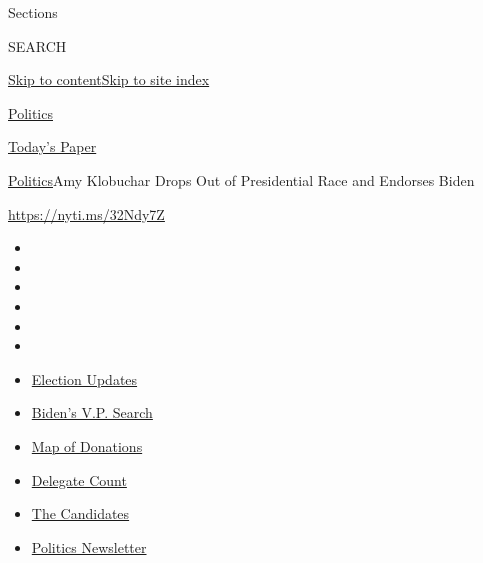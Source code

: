 Sections

SEARCH

\protect\hyperlink{site-content}{Skip to
content}\protect\hyperlink{site-index}{Skip to site index}

\href{https://www.nytimes.com/section/politics}{Politics}

\href{https://myaccount.nytimes.com/auth/login?response_type=cookie\&client_id=vi}{}

\href{https://www.nytimes.com/section/todayspaper}{Today's Paper}

\href{/section/politics}{Politics}\textbar{}Amy Klobuchar Drops Out of
Presidential Race and Endorses Biden

\url{https://nyti.ms/32Ndy7Z}

\begin{itemize}
\item
\item
\item
\item
\item
\item
\end{itemize}

\begin{itemize}
\item
  \href{https://www.nytimes.com/2020/07/31/us/elections/biden-vs-trump.html?action=click\&pgtype=Article\&state=default\&region=TOP_BANNER\&context=storylines_menu}{Election
  Updates}
\item
  \href{https://www.nytimes.com/article/biden-vice-president-2020.html?action=click\&pgtype=Article\&state=default\&region=TOP_BANNER\&context=storylines_menu}{Biden's
  V.P. Search}
\item
  \href{https://www.nytimes.com/interactive/2020/07/24/us/politics/trump-biden-campaign-donors.html?action=click\&pgtype=Article\&state=default\&region=TOP_BANNER\&context=storylines_menu}{Map
  of Donations}
\item
  \href{https://www.nytimes.com/interactive/2020/us/elections/delegate-count-primary-results.html?action=click\&pgtype=Article\&state=default\&region=TOP_BANNER\&context=storylines_menu}{Delegate
  Count}
\item
  \href{https://www.nytimes.com/interactive/2019/us/politics/2020-presidential-candidates.html?action=click\&pgtype=Article\&state=default\&region=TOP_BANNER\&context=storylines_menu}{The
  Candidates}
\item
  \href{https://www.nytimes.com/newsletters/politics?action=click\&pgtype=Article\&state=default\&region=TOP_BANNER\&context=storylines_menu}{Politics
  Newsletter}
\end{itemize}

